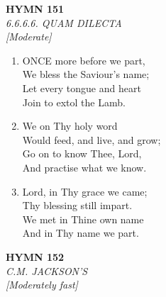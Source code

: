 \documentclass[11pt,a4paper]{article}
\begin{document}
\newpage
\begin{center}
    {\Large \textbf{HYMN 151}}
    \\
    \textit{6.6.6.6. QUAM DILECTA}
    \\
    \textit{\small [Moderate]}
\end{center}
\vspace{1em}

\begin{enumerate}
    \item ONCE more before we part, \\
        We bless the Saviour's name; \\
        Let every tongue and heart \\
        Join to extol the Lamb.

    \item We on Thy holy word \\
        Would feed, and live, and grow; \\
        Go on to know Thee, Lord, \\
        And practise what we know.

    \item Lord, in Thy grace we came; \\
        Thy blessing still impart. \\
        We met in Thine own name \\
        And in Thy name we part.

\end{enumerate}

\newpage
\begin{center}
    {\Large \textbf{HYMN 152}}
    \\
    \textit{C.M. JACKSON'S}
    \\
    \textit{\small [Moderately fast]}
\end{center}
\vspace{1em}
\end{document}
